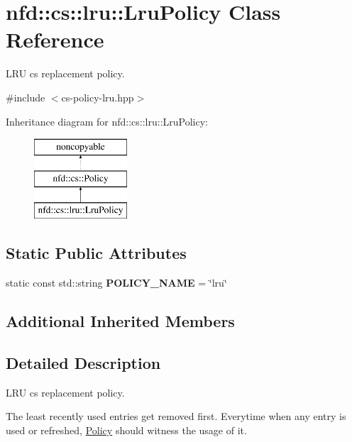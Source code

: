 \hypertarget{classnfd_1_1cs_1_1lru_1_1LruPolicy}{}\section{nfd\+:\+:cs\+:\+:lru\+:\+:Lru\+Policy Class Reference}
\label{classnfd_1_1cs_1_1lru_1_1LruPolicy}


L\+RU cs replacement policy.  




{\ttfamily \#include $<$cs-\/policy-\/lru.\+hpp$>$}

Inheritance diagram for nfd\+:\+:cs\+:\+:lru\+:\+:Lru\+Policy\+:\begin{figure}[H]
\begin{center}
\leavevmode
\includegraphics[height=3.000000cm]{classnfd_1_1cs_1_1lru_1_1LruPolicy}
\end{center}
\end{figure}
\subsection*{Static Public Attributes}
\begin{DoxyCompactItemize}
\item 
static const std\+::string {\bfseries P\+O\+L\+I\+C\+Y\+\_\+\+N\+A\+ME} = \char`\"{}lru\char`\"{}\hypertarget{classnfd_1_1cs_1_1lru_1_1LruPolicy_abd1a75e8112632f6e9d413514a44a1f4}{}\label{classnfd_1_1cs_1_1lru_1_1LruPolicy_abd1a75e8112632f6e9d413514a44a1f4}

\end{DoxyCompactItemize}
\subsection*{Additional Inherited Members}


\subsection{Detailed Description}
L\+RU cs replacement policy. 

The least recently used entries get removed first. Everytime when any entry is used or refreshed, \hyperlink{classnfd_1_1cs_1_1Policy}{Policy} should witness the usage of it. 

